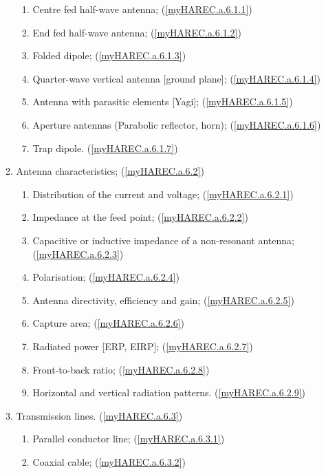 \begin{enumerate}
\begin{enumerate}[noitemsep]
\begin{enumerate}[noitemsep]
\item Centre fed half-wave antenna; (\ref{myHAREC.a.6.1.1})\label{HAREC.a.6.1.1}
\item End fed half-wave antenna; (\ref{myHAREC.a.6.1.2})\label{HAREC.a.6.1.2}
\item Folded dipole; (\ref{myHAREC.a.6.1.3})\label{HAREC.a.6.1.3}
\item Quarter-wave vertical antenna [ground plane]; (\ref{myHAREC.a.6.1.4})\label{HAREC.a.6.1.4}
\item Antenna with parasitic elements [Yagi]; (\ref{myHAREC.a.6.1.5})\label{HAREC.a.6.1.5}
\item Aperture antennas (Parabolic reflector, horn); (\ref{myHAREC.a.6.1.6})\label{HAREC.a.6.1.6}
\item Trap dipole. (\ref{myHAREC.a.6.1.7})\label{HAREC.a.6.1.7}
\end{enumerate}
\item Antenna characteristics; (\ref{myHAREC.a.6.2})\label{HAREC.a.6.2}
\begin{enumerate}[noitemsep]
\item Distribution of the current and voltage; (\ref{myHAREC.a.6.2.1})\label{HAREC.a.6.2.1}
\item Impedance at the feed point; (\ref{myHAREC.a.6.2.2})\label{HAREC.a.6.2.2}
\item Capacitive or inductive impedance of a non-resonant antenna; (\ref{myHAREC.a.6.2.3})\label{HAREC.a.6.2.3}
\item Polarisation; (\ref{myHAREC.a.6.2.4})\label{HAREC.a.6.2.4}
\item Antenna directivity, efficiency and gain; (\ref{myHAREC.a.6.2.5})\label{HAREC.a.6.2.5}
\item Capture area; (\ref{myHAREC.a.6.2.6})\label{HAREC.a.6.2.6}
\item Radiated power [ERP, EIRP]; (\ref{myHAREC.a.6.2.7})\label{HAREC.a.6.2.7}
\item Front-to-back ratio; (\ref{myHAREC.a.6.2.8})\label{HAREC.a.6.2.8}
\item Horizontal and vertical radiation patterns. (\ref{myHAREC.a.6.2.9})\label{HAREC.a.6.2.9}
\end{enumerate}
\item Transmission lines. (\ref{myHAREC.a.6.3})\label{HAREC.a.6.3}
\begin{enumerate}[noitemsep]
\item Parallel conductor line; (\ref{myHAREC.a.6.3.1})\label{HAREC.a.6.3.1}
\item Coaxial cable; (\ref{myHAREC.a.6.3.2})\label{HAREC.a.6.3.2}

\end{enumerate}
\end{enumerate}
\end{enumerate}
